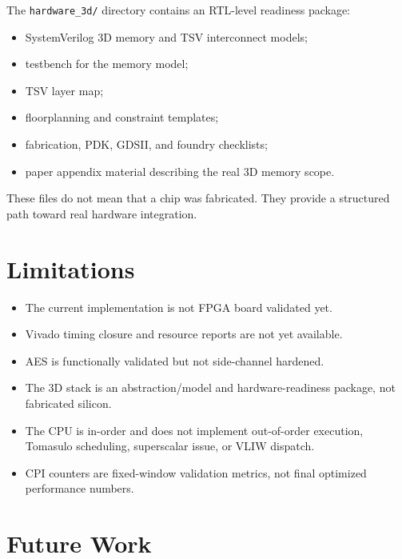 \documentclass[conference]{IEEEtran}
\begin{document}
The \texttt{hardware\_3d/} directory contains an RTL-level readiness package:

\begin{itemize}
    \item SystemVerilog 3D memory and TSV interconnect models;
    \item testbench for the memory model;
    \item TSV layer map;
    \item floorplanning and constraint templates;
    \item fabrication, PDK, GDSII, and foundry checklists;
    \item paper appendix material describing the real 3D memory scope.
\end{itemize}

These files do not mean that a chip was fabricated. They provide a structured path toward real hardware integration.

\section{Limitations}

\begin{itemize}
    \item The current implementation is not FPGA board validated yet.
    \item Vivado timing closure and resource reports are not yet available.
    \item AES is functionally validated but not side-channel hardened.
    \item The 3D stack is an abstraction/model and hardware-readiness package, not fabricated silicon.
    \item The CPU is in-order and does not implement out-of-order execution, Tomasulo scheduling, superscalar issue, or VLIW dispatch.
    \item CPI counters are fixed-window validation metrics, not final optimized performance numbers.
\end{itemize}

\section{Future Work}
\end{document}
